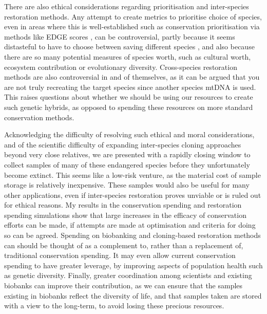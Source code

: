 \documentclass[12pt]{article}
\begin{document}
	
	
	There are also ethical considerations regarding prioritisation and inter-species
	restoration methods.
	Any attempt to create metrics to prioritise choice of species, even in areas
	where this is well-established such as conservation prioritisation via methods
	like EDGE scores \citep{isaacMammalsEDGEConservation2007}, can be controversial,
	partly because it seems distasteful to have to choose between saving different
	species \citep{bottrillConservationTriageJust2008},
	and also because there are so many potential measures of species worth,
	such as cultural worth, ecosystem contribution or evolutionary diversity.
	Cross-species restoration methods are also controversial in and of themselves,
	as it can be argued that you are not truly recreating the target species since
	another species mtDNA is used. This raises questions about whether we should
	be using our resources to create such genetic hybrids, as opposed to spending
	these resources on more standard conservation methods.
	
	Acknowledging the difficulty of resolving such ethical and moral considerations,
	and of the scientific difficulty of expanding inter-species cloning approaches
	beyond very close relatives, we are presented with a rapidly
	closing window to collect samples of many of these endangered species before
	they unfortunately become extinct. This seems like a low-risk venture, as the
	material cost of sample storage is relatively inexpensive. These samples would
	also be useful for many other applications, even if inter-species restoration
	proves unviable or is ruled out for ethical reasons. My results
	in the conservation spending and restoration spending simulations show that
	large increases in the efficacy of conservation efforts can be made, if attempts
	are made at optimisation and criteria for doing so can be
	agreed. Spending on biobanking and cloning-based restoration methods can
	should be thought of as a complement to, rather than a replacement of,
	traditional conservation spending. It may even allow current conservation
	spending to have greater leverage, by improving aspects of population health
	such as genetic diversity.
	Finally, greater coordination among scientists and existing biobanks
	can improve their contribution, as we can ensure that the samples existing in
	biobanks reflect the diversity of life, and that samples taken are stored with
	a view to the long-term, to avoid losing these precious resources.
	
\end{document}

